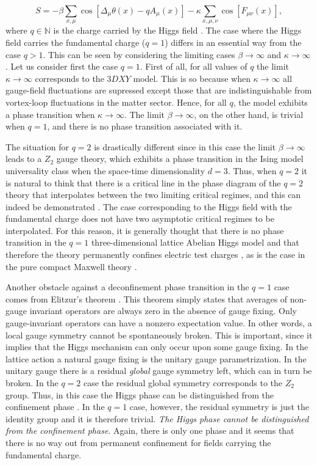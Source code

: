 \documentclass[a4paper,showpacs,preprintnumbers,amsmath,amssymb,prl,twocolumn]{revtex4}
\begin{document}
\begin{equation}
\label{Higgs}
S=-\beta\sum_{x,\mu}\cos[\Delta_\mu\theta(x)-qA_\mu(x)]
-\kappa\sum_{x,\mu,\nu}\cos[F_{\mu\nu}(x)],
\end{equation}
where $q\in\mathbb{N}$ is the charge carried by the Higgs field . 
The case where the Higgs field carries the 
fundamental charge ($q=1$) differs 
in an essential way from the case $q>1$. 
This can be seen by considering the limiting cases $\beta\to\infty$ 
and $\kappa\to\infty$. Let us consider first the case $q=1$. First 
of all, for all values of $q$ the limit $\kappa\to\infty$ corresponds 
to the $3DXY$ model. This is so because when $\kappa \to \infty$
all gauge-field fluctuations are supressed except those that 
are indistinguishable from vortex-loop fluctuations in the matter 
sector. Hence, for all $q$, the model exhibits a phase transition 
when $\kappa \to \infty$. The limit $\beta\to\infty$, on the other hand, 
is trivial when $q=1$, and there is no phase transition associated with 
it. 

The situation for $q=2$ is drastically different since in this 
case the limit $\beta\to\infty$ leads to a $Z_2$ gauge theory, 
which exhibits a phase transition in the Ising model universality class 
when the space-time dimensionality $d=3$. Thus, when $q=2$ it is natural 
to think that there is a critical line in the phase diagram of the $q=2$ 
theory that interpolates between the two limiting critical regimes, and 
this can indeed be demonstrated \cite{Bhanot,Sudbo,Smiseth}. The case 
corresponding to the Higgs field with the 
fundamental charge does not have two asymptotic critical regimes 
to be interpolated. For this reason, it is generally thought that there 
is no phase transition in the $q=1$ three-dimensional lattice Abelian Higgs 
model and that therefore the theory permanently confines electric test 
charges \cite{FradShe}, as is the case in the pure compact Maxwell theory 
\cite{Polyakov}.

Another obstacle against a deconfinement phase transition in the $q=1$ 
case comes from Elitzur's theorem \cite{Elitzur}. This theorem 
simply states that averages of non-gauge invariant operators 
are always zero in the absence of gauge fixing. Only gauge-invariant 
operators can have a nonzero expectation value. In other words, 
a local gauge symmetry cannot be spontaneously broken. This is  
important, since it implies that the Higgs mechanism can only occur upon 
some gauge fixing. In the lattice action a natural gauge 
fixing is the unitary gauge parametrization. In the unitary gauge 
there is a residual {\it global} gauge symmetry left, which can in 
turn be broken. In the $q=2$ case the residual global symmetry 
corresponds to the $Z_2$ group. Thus, in this case the Higgs phase 
can be distinguished from the confinement phase \cite{FradShe}. In 
the $q=1$ case, however, the residual symmetry is just the identity 
group and it is therefore trivial. {\it The Higgs phase cannot be 
distinguished from the confinement phase}. Again, there is only one 
phase and it seems that there is no way out from permanent confinement 
for fields carrying the fundamental charge.        
\end{document}
